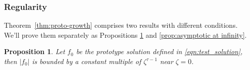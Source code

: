 \documentclass{article}
\theoremstyle{plain}
\newtheorem{prop}{Proposition}
\newtheorem{rmk}{Remark}
\begin{document}
\subsubsection{Regularity}\label{sec:asymptotics}
Theorem~\ref{thm:proto-growth} comprises two results with different conditions. We'll prove them separately as Propositions \ref{prop:asymptotic at zero} and \ref{prop:asymptotic at infinity}.
\begin{prop}\label{prop:asymptotic at zero}
    Let $f_0$ be the prototype solution defined in \eqref{eqn:test_solution}, then $|f_0|$ is bounded by a constant multiple of $\zeta^{\tau-1}$ near $\zeta=0$. 
\end{prop}
\end{document}

